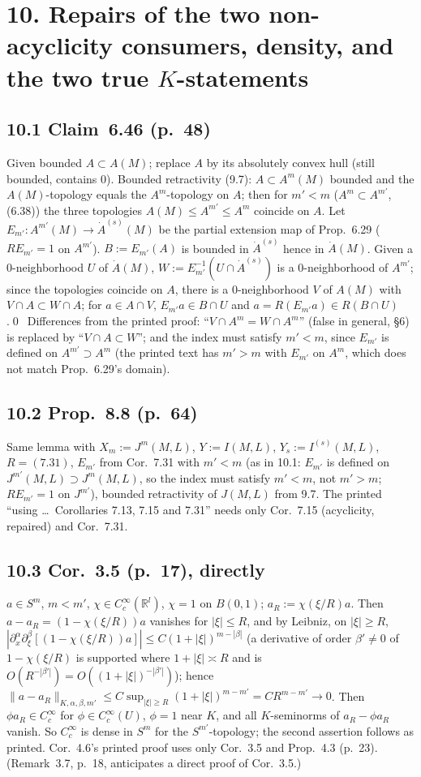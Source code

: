 \documentclass[11pt]{article}
\newcommand{\R}{\mathbb{R}}
\begin{document}
\section*{10. Repairs of the two non-acyclicity consumers, density, and the two true $K$-statements}
\subsection*{10.1 Claim~6.46 (p.~48)}
Given bounded $A\subset A(M)$; replace $A$ by its absolutely convex hull (still bounded, contains $0$). Bounded retractivity (9.7): $A\subset A^m(M)$ bounded and the $A(M)$-topology equals the $A^m$-topology on $A$; then for $m'<m$ ($A^m\subset A^{m'}$, (6.38)) the three topologies $A(M)\le A^{m'}\le A^m$ coincide on $A$. Let $E_{m'}\colon A^{m'}(M)\to\dot A^{(s)}(M)$ be the partial extension map of Prop.~6.29 ($RE_{m'}=1$ on $A^{m'}$). $B:=E_{m'}(A)$ is bounded in $\dot A^{(s)}$ hence in $\dot A(M)$. Given a 0-neighborhood $U$ of $\dot A(M)$, $W:=E_{m'}^{-1}(U\cap\dot A^{(s)})$ is a 0-neighborhood of $A^{m'}$; since the topologies coincide on $A$, there is a 0-neighborhood $V$ of $A(M)$ with $V\cap A\subset W\cap A$; for $a\in A\cap V$, $E_{m'}a\in B\cap U$ and $a=R(E_{m'}a)\in R(B\cap U)$.\qed\ Differences from the printed proof: ``$V\cap A^m=W\cap A^m$'' (false in general, \S6) is replaced by ``$V\cap A\subset W$''; and the index must satisfy $m'<m$, since $E_{m'}$ is defined on $A^{m'}\supset A^m$ (the printed text has $m'>m$ with $E_{m'}$ on $A^m$, which does not match Prop.~6.29's domain).

\subsection*{10.2 Prop.~8.8 (p.~64)}
Same lemma with $X_m:=J^m(M,L)$, $Y:=I(M,L)$, $Y_s:=I^{(s)}(M,L)$, $R=(7.31)$, $E_{m'}$ from Cor.~7.31 with $m'<m$ (as in 10.1: $E_{m'}$ is defined on $J^{m'}(M,L)\supset J^m(M,L)$, so the index must satisfy $m'<m$, not $m'>m$; $RE_{m'}=1$ on $J^{m'}$), bounded retractivity of $J(M,L)$ from 9.7. The printed ``using \dots\ Corollaries 7.13, 7.15 and 7.31'' needs only Cor.~7.15 (acyclicity, repaired) and Cor.~7.31.

\subsection*{10.3 Cor.~3.5 (p.~17), directly}
$a\in S^m$, $m<m'$, $\chi\in C_c^\infty(\R^l)$, $\chi=1$ on $B(0,1)$; $a_R:=\chi(\xi/R)a$. Then $a-a_R=(1-\chi(\xi/R))a$ vanishes for $|\xi|\le R$, and by Leibniz, on $|\xi|\ge R$, $|\partial^\alpha_x\partial^\beta_\xi[(1-\chi(\xi/R))a]|\le C(1+|\xi|)^{m-|\beta|}$ (a derivative of order $\beta'\ne0$ of $1-\chi(\xi/R)$ is supported where $1+|\xi|\asymp R$ and is $O(R^{-|\beta'|})=O((1+|\xi|)^{-|\beta'|})$); hence $\|a-a_R\|_{K,\alpha,\beta,m'}\le C\sup_{|\xi|\ge R}(1+|\xi|)^{m-m'}=CR^{m-m'}\to0$. Then $\phi a_R\in C_c^\infty$ for $\phi\in C_c^\infty(U)$, $\phi=1$ near $K$, and all $K$-seminorms of $a_R-\phi a_R$ vanish. So $C_c^\infty$ is dense in $S^m$ for the $S^{m'}$-topology; the second assertion follows as printed. Cor.~4.6's printed proof uses only Cor.~3.5 and Prop.~4.3 (p.~23). (Remark~3.7, p.~18, anticipates a direct proof of Cor.~3.5.)
\end{document}
